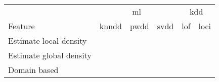 

\begin{tabular}{lccccc}\toprule
&\multicolumn{3}{c}{ml}&\multicolumn{2}{c}{kdd}\\
\cmidrule(r){2-4}\cmidrule(){5-6}
Feature&\multicolumn{1}{c}{knndd}&\multicolumn{1}{c}{pwdd}&\multicolumn{1}{c}{svdd}&\multicolumn{1}{c}{lof}&\multicolumn{1}{c}{loci}\\
\midrule
\rowcolor[gray]{0.9}
Estimate local density & \y & &  & \y &\y  \\
Estimate global density& &\y  & &  & \\
\rowcolor[gray]{0.9}
Domain based & & &\y &  &  \\
\bottomrule
\end{tabular}